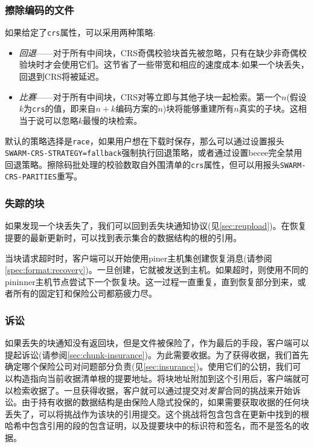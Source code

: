 \subsubsection{擦除编码的文件}

如果给定了\lstinline{crs}属性，可以采用两种策略: 

\begin{itemize}
\item \emph{回退}——对于所有中间块，CRS奇偶校验块首先被忽略，只有在缺少非奇偶校验块时才会使用它们。这节省了一些带宽和相应的速度成本:如果一个块丢失，回退到CRS将被延迟。
\item \emph{比赛}——对于所有中间块，CRS对等立即与其他子块一起检索。第一个$n$(假设$k$为\lstinline{crs}的值，即来自$n+k$编码方案的$n$)块将能够重建所有$n$真实的子块。这相当于说可以忽略$k$最慢的块检索。  
\end{itemize}

默认的策略选择是\lstinline{race}，如果用户想在下载时保存，那么可以通过设置报头\lstinline{SWARM-CRS-STRATEGY=fallback}强制执行回退策略，或者通过设置becee完全禁用回退策略。擦除码批处理的校验数取自外围清单的\lstinline{crs}属性，但可以用报头\lstinline{SWARM-CRS-PARITIES}重写。

\subsubsection{失踪的块}

如果发现一个块丢失了，我们可以回到丢失块通知协议(见\ref{sec:reupload})。在恢复提要的最新更新时，可以找到表示集合的数据结构的根的引用。

当块请求超时时，客户端可以开始使用piner主机集创建恢复消息(请参阅\ref{spec:format:recovery})。一旦创建，它就被发送到主机。如果超时，则使用不同的pininner主机节点尝试下一个恢复块。这一过程一直重复，直到恢复部分到来，或者所有的固定钉和保险公司都筋疲力尽。

\subsubsection{诉讼}

如果丢失的块通知没有返回块，但是文件被保险了，作为最后的手段，客户端可以提起诉讼(请参阅\ref{sec:chunk-insurance})。为此需要收据。为了获得收据，我们首先确定哪个保险公司对问题部分负责(见\ref{sec:insurance})。使用它们的公钥，我们可以构造指向当前收据清单根的提要地址。将块地址附加到这个引用后，客户端就可以检索收据了。一旦获得收据，客户就可以通过提交对\emph{发誓}合同的挑战来开始诉讼。由于持有收据的数据结构是由保险人隐式投保的，如果需要获取收据的任何块丢失了，可以将挑战作为该块的引用提交。这个挑战将包含包含在更新中找到的根哈希中包含引用的段的包含证明，以及提要块中的标识符和签名，而不是签名的收据。 


